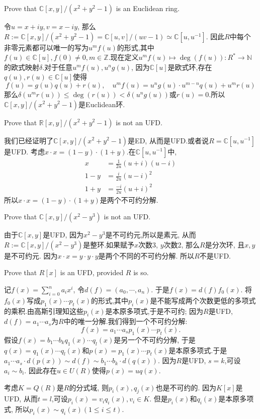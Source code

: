 \documentclass{exam-zh}
\newcommand{\NN}{{\mathbb{N}}}
\newcommand{\ZZ}{{\mathbb{Z}}}
\newcommand{\RR}{{\mathbb{R}}}
\newcommand{\CC}{{\mathbb{C}}}
\newcommand{\isom}{\simeq}
\begin{document}
\begin{question}
  Prove that $\CC[x,y]/(x^2+y^2-1)$ is an Euclidean ring.
\end{question}
\begin{solution}
  令$u=x+iy, v=x-iy$, 那么$R:=\CC[x,y]/(x^2+y^2-1)=\CC[u,v]/(uv-1)\isom\CC[u,u^{-1}]$. 因此$R$中每个非零元素都可以唯一的写为$u^mf(u)$的形式,其中$f(u)\in\CC[u], f(0)\neq 0, m\in\ZZ$.现在定义$u^mf(u)\mapsto \deg(f(u)):R^*\to\NN$的欧式映射$\delta$.对于任意$u^mf(u), u^ng(u)$, 因为$\CC[u]$是欧式环,存在$q(u),r(u)\in\CC[u]$使得\[f(u)=g(u)q(u)+r(u), \quad u^mf(u)=u^ng(u)\cdot u^{m-n}q(u)+u^mr(u)\]那么$\delta(u^mr(u))\leq\deg(r(u))<\delta(u^ng(u))$或$r(u)=0$.所以$\CC[x,y]/(x^2+y^2-1)$是Euclidean环.
\end{solution}
\begin{question}
  Prove that $\RR[x,y]/(x^2+y^2-1)$ is not an UFD.
\end{question}
\begin{solution}
  我们已经证明了$\CC[x,y]/(x^2+y^2-1)$是ED, 从而是UFD.或者说$R=\CC[u,u^{-1}]$是UFD. 考虑$x\cdot x=(1-y)\cdot(1+y)$.在$\CC[u,u^{-1}]$中,\[\begin{split}
    x&=\frac{1}{2u}(u+i)(u-i)\\1-y&=\frac{i}{2u}(u-i)^2\\1+y&=\frac{-i}{2u}(u+i)^2
  \end{split}\]所以$x\cdot x=(1-y)\cdot(1+y)$是两个不可约分解.
\end{solution}
\begin{question}
  Prove that $\CC[x,y]/(x^2-y^3)$ is not an UFD.
\end{question}
\begin{solution}
  由于$\CC[x,y]$是UFD, 因为$x^2-y^3$是不可约元,所以是素元, 从而$R:=\CC[x,y]/(x^2-y^3)$是整环.如果赋予$x$次数3, $y$次数2, 那么$R$是分次环, 且$x,y$是不可约元. 因为$x\cdot x=y\cdot y\cdot y$是两个不同的不可约分解. 所以$R$不是UFD.
\end{solution}
\begin{question}
  Prove that $R[x]$ is an UFD, provided $R$ is so.
\end{question}
\begin{solution}
  记$f(x)=\sum_{i=0}^na_ix^i$, 令$d(f)=(a_0,\cdots,a_n)$. 于是$f(x)=d(f)f_0(x)$. 将$f_0(x)$写成$p_1(x)\cdots p_t(x)$的形式,其中$p_i(x)$是不能写成两个次数更低的多项式的乘积.由高斯引理知这些$p_i(x)$是本原多项式,于是不可约; 因为$R$是UFD, $d(f)=a_1\cdots a_s$为$R$中的唯一分解.我们得到一个不可约分解:\[f(x)=a_1\cdots a_sp_1(x)\cdots p_t(x).\]
  假设$f(x)=b_1\cdots b_kq_1(x)\cdots q_l(x)$是另一个不可约分解, 于是$q(x)=q_1(x)\cdots q_l(x)$和$p(x)=p_1(x)\cdots p_t(x)$是本原多项式.于是$a_1\cdots a_s\cdot d(p(x))\sim d(f)\sim b_1\cdots b_k\cdot d(q(x))$. 因为$R$是UFD, $s=k$,可设$a_i\sim b_i$. 因此存在$u\in U(R)$使得$p(x)=uq(x)$.
  
  考虑$K=Q(R)$是$R$的分式域, 则$p_i(x), q_j(x)$也是不可约的. 因为$K[x]$是UFD, 从而$t=l$,可设$p_i(x)=v_iq_i(x), v_i\in K$. 但是$p_i(x)$和$q_i(x)$是本原多项式, 所以$p_i(x)\sim q_i(x)(1\leq i\leq t)$.
\end{solution}
\end{document}
